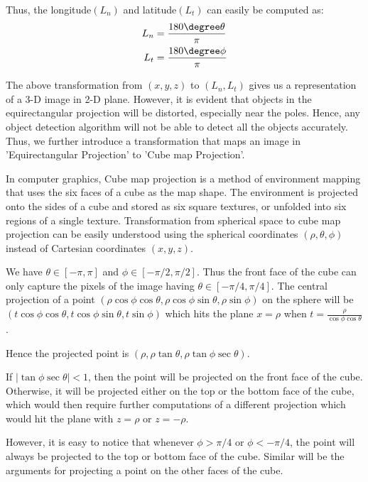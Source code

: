  Thus, the longitude\((L_n)\) and latitude\((L_t)\) can easily be computed as:
\begin{equation*}
\begin{split}
L_n  &= \frac{180\degree \theta}{\pi} \\ 
L_t &= \frac{180\degree \phi}{\pi}
\end{split}
\end{equation*}

The above transformation from \((x,y,z)\) to \((L_n, L_t)\) gives us a representation of a 3-D image in 2-D plane. However, it is evident that objects in the equirectangular projection will be distorted, especially near the poles. Hence, any object detection algorithm will not be able to detect all the objects accurately. Thus, we further introduce a transformation that maps an image in 'Equirectangular Projection' to 'Cube map Projection'.

\par
In computer graphics, Cube map projection is a method of environment mapping that uses the six faces of a cube as the map shape. The environment is projected onto the sides of a cube and stored as six square textures, or unfolded into six regions of a single texture. Transformation from spherical space to cube map projection can be easily understood using the spherical coordinates \((\rho, \theta, \phi)\) instead of Cartesian coordinates \((x,y,z)\).
\par
We have \(\theta \in [-\pi, \pi]\) and \(\phi \in [-\pi/2, \pi/2]\). Thus the front face of the cube can only capture the pixels of the image having \(\theta \in [-\pi/4, \pi/4]\). The central projection of a point \((\rho\cos\phi\cos\theta, \rho\cos\phi\sin\theta, \rho\sin\phi)\) on the sphere will be \((t\cos\phi\cos\theta, t\cos\phi\sin\theta, t\sin\phi)\) which hits the plane \(x=\rho\) when \(t=\frac{\rho}{\cos\phi\cos\theta}\).
\par
Hence the projected point is \((\rho, \rho\tan\theta, \rho\tan\phi\sec\theta)\).
\par
If \(|\tan\phi\sec\theta| < 1\), then the point will be projected on the front face of the cube. Otherwise, it will be projected either on the top or the bottom face of the cube, which would then require further computations of a different projection which would hit the plane with \(z=\rho\) or \(z=-\rho\).
\par
However, it is easy to notice that whenever \(\phi>\pi/4\) or \(\phi<-\pi/4\), the point will always be projected to the top or bottom face of the cube. Similar will be the arguments for projecting a point on the other faces of the cube.

